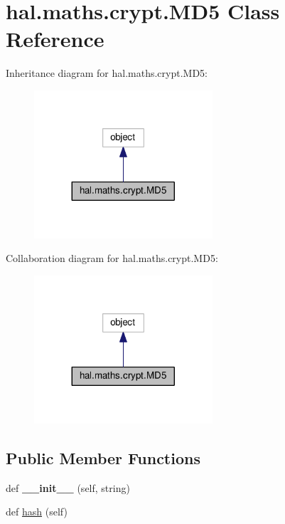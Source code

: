 \hypertarget{classhal_1_1maths_1_1crypt_1_1_m_d5}{}\section{hal.\+maths.\+crypt.\+M\+D5 Class Reference}
\label{classhal_1_1maths_1_1crypt_1_1_m_d5}


Inheritance diagram for hal.\+maths.\+crypt.\+M\+D5\+:\nopagebreak
\begin{figure}[H]
\begin{center}
\leavevmode
\includegraphics[width=188pt]{classhal_1_1maths_1_1crypt_1_1_m_d5__inherit__graph}
\end{center}
\end{figure}


Collaboration diagram for hal.\+maths.\+crypt.\+M\+D5\+:\nopagebreak
\begin{figure}[H]
\begin{center}
\leavevmode
\includegraphics[width=188pt]{classhal_1_1maths_1_1crypt_1_1_m_d5__coll__graph}
\end{center}
\end{figure}
\subsection*{Public Member Functions}
\begin{DoxyCompactItemize}
\item 
def {\bfseries \+\_\+\+\_\+init\+\_\+\+\_\+} (self, string)\hypertarget{classhal_1_1maths_1_1crypt_1_1_m_d5_a904093421d68e73ab12f6d00f3e0beff}{}\label{classhal_1_1maths_1_1crypt_1_1_m_d5_a904093421d68e73ab12f6d00f3e0beff}

\item 
def \hyperlink{classhal_1_1maths_1_1crypt_1_1_m_d5_a5f2fcd9c5019f5ace7f70f7a6b514123}{hash} (self)
\end{DoxyCompactItemize}
